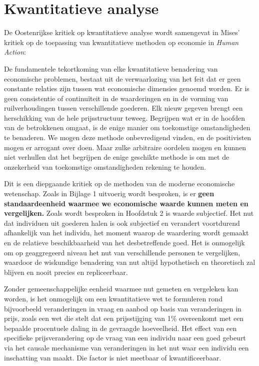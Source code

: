 \section{Kwantitatieve analyse}

De Oostenrijkse kritiek op kwantitatieve analyse wordt samengevat in Mises’ kritiek op de toepassing van kwantitatieve methoden op economie in \textit{Human Action}:


\begin{blockquotebox}
De fundamentele tekortkoming van elke kwantitatieve benadering van economische problemen, bestaat uit de verwaarlozing van het feit dat er geen constante relaties zijn tussen wat economische dimensies genoemd worden. Er is geen consistentie of continuïteit in de waarderingen en in de vorming van ruilverhoudingen tussen verschillende goederen. Elk nieuw gegeven brengt een herschikking van de hele prijsstructuur teweeg. Begrijpen wat er in de hoofden van de betrokkenen omgaat, is de enige manier om toekomstige omstandigheden te benaderen.  We mogen deze methode onbevredigend vinden, en de positivisten mogen er arrogant over doen. Maar zulke arbitraire oordelen mogen en kunnen niet verhullen dat het begrijpen de enige geschikte methode is om met de onzekerheid van toekomstige omstandigheden rekening te houden.\footnotemark
\end{blockquotebox}


Dit is een diepgaande kritiek op de methoden van de moderne economische wetenschap. Zoals in Bijlage 1 uitvoerig wordt besproken, is er \textbf{geen standaardeenheid waarmee we economische waarde kunnen meten en vergelijken.} Zoals wordt besproken in Hoofdstuk 2 is waarde subjectief. Het nut dat individuen uit goederen halen is ook subjectief en verandert voortdurend afhankelijk van het individu, het moment waarop de waardering wordt gemaakt en de relatieve beschikbaarheid van het desbetreffende goed. Het is onmogelijk om op geaggregeerd niveau het nut van verschillende personen te vergelijken, waardoor de wiskundige benadering van nut altijd hypothetisch en theoretisch zal blijven en nooit precies en repliceerbaar.

Zonder gemeenschappelijke eenheid waarmee nut gemeten en vergeleken kan worden, is het onmogelijk om een kwantitatieve wet te formuleren rond bijvoorbeeld veranderingen in vraag en aanbod op basis van veranderingen in prijs, zoals een wet die stelt dat een prijsstijging van 1\% overeenkomt met een bepaalde procentuele daling in de gevraagde hoeveelheid. Het effect van een specifieke prijsverandering op de vraag van een individu naar een goed gebeurt via het causale mechanisme van veranderingen in het nut waar een individu een inschatting van maakt. Die factor is niet meetbaar of kwantificeerbaar.

